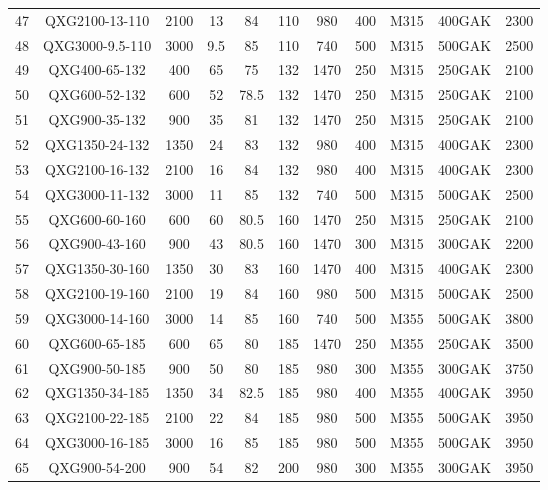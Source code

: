 \begin{table}[H]
{\begin{tabular}{ccccccccccc}
	47    & QXG2100-13-110 & 2100  & 13    & 84    & 110   & 980   & 400   & M315  & 400GAK & 2300 \\
	48    & QXG3000-9.5-110 & 3000  & 9.5   & 85    & 110   & 740   & 500   & M315  & 500GAK & 2500 \\
	49    & QXG400-65-132 & 400   & 65    & 75    & 132   & 1470  & 250   & M315  & 250GAK & 2100 \\
	50    & QXG600-52-132 & 600   & 52    & 78.5  & 132   & 1470  & 250   & M315  & 250GAK & 2100 \\
	51    & QXG900-35-132 & 900   & 35    & 81    & 132   & 1470  & 250   & M315  & 250GAK & 2100 \\
	52    & QXG1350-24-132 & 1350  & 24    & 83    & 132   & 980   & 400   & M315  & 400GAK & 2300 \\
	53    & QXG2100-16-132 & 2100  & 16    & 84    & 132   & 980   & 400   & M315  & 400GAK & 2300 \\
	54    & QXG3000-11-132 & 3000  & 11    & 85    & 132   & 740   & 500   & M315  & 500GAK & 2500 \\
	55    & QXG600-60-160 & 600   & 60    & 80.5  & 160   & 1470  & 250   & M315  & 250GAK & 2100 \\
	56    & QXG900-43-160 & 900   & 43    & 80.5  & 160   & 1470  & 300   & M315  & 300GAK & 2200 \\
	57    & QXG1350-30-160 & 1350  & 30    & 83    & 160   & 1470  & 400   & M315  & 400GAK & 2300 \\
	58    & QXG2100-19-160 & 2100  & 19    & 84    & 160   & 980   & 500   & M315  & 500GAK & 2500 \\
	59    & QXG3000-14-160 & 3000  & 14    & 85    & 160   & 740   & 500   & M355  & 500GAK & 3800 \\
	60    & QXG600-65-185 & 600   & 65    & 80    & 185   & 1470  & 250   & M355  & 250GAK & 3500 \\
	61    & QXG900-50-185 & 900   & 50    & 80    & 185   & 980   & 300   & M355  & 300GAK & 3750 \\
	62    & QXG1350-34-185 & 1350  & 34    & 82.5  & 185   & 980   & 400   & M355  & 400GAK & 3950 \\
	63    & QXG2100-22-185 & 2100  & 22    & 84    & 185   & 980   & 500   & M355  & 500GAK & 3950 \\
	64    & QXG3000-16-185 & 3000  & 16    & 85    & 185   & 980   & 500   & M355  & 500GAK & 3950 \\
	65    & QXG900-54-200 & 900   & 54    & 82    & 200   & 980   & 300   & M355  & 300GAK & 3950 \\

\end{tabular}}
\end{table}

